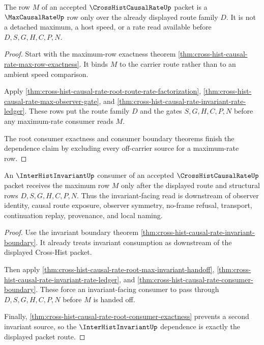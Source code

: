 \begin{theorem}
\label{thm:cross-hist-causal-rate-maxcausalrate-dependence}
The row $M$ of an accepted $\CrossHistCausalRateUp$ packet is a $\MaxCausalRateUp$ row only over the already displayed route family $D$. It is not a detached maximum, a host speed, or a rate read available before $D,S,G,H,C,P,N$.
\end{theorem}
\begin{proof}
Start with the maximum-row exactness theorem \autoref{thm:cross-hist-causal-rate-max-row-exactness}. It binds $M$ to the carrier route rather than to an ambient speed comparison.

Apply \autoref{thm:cross-hist-causal-rate-root-route-rate-factorization}, \autoref{thm:cross-hist-causal-rate-max-observer-gate}, and \autoref{thm:cross-hist-causal-rate-invariant-rate-ledger}. These rows put the route family $D$ and the gates $S,G,H,C,P,N$ before any maximum-rate consumer reads $M$.

The root consumer exactness and consumer boundary theorems finish the dependence claim by excluding every off-carrier source for a maximum-rate row.
\end{proof}

\begin{theorem}
\label{thm:cross-hist-causal-rate-interhist-invariant-dependence}
An $\InterHistInvariantUp$ consumer of an accepted $\CrossHistCausalRateUp$ packet receives the maximum row $M$ only after the displayed route and structural rows $D,S,G,H,C,P,N$. Thus the invariant-facing read is downstream of observer identity, causal route exposure, observer symmetry, no-frame refusal, transport, continuation replay, provenance, and local naming.
\end{theorem}
\begin{proof}
Use the invariant boundary theorem \autoref{thm:cross-hist-causal-rate-invariant-boundary}. It already treats invariant consumption as downstream of the displayed Cross-Hist packet.

Then apply \autoref{thm:cross-hist-causal-rate-root-max-invariant-handoff}, \autoref{thm:cross-hist-causal-rate-invariant-rate-ledger}, and \autoref{thm:cross-hist-causal-rate-consumer-boundary}. These force an invariant-facing consumer to pass through $D,S,G,H,C,P,N$ before $M$ is handed off.

Finally, \autoref{thm:cross-hist-causal-rate-root-consumer-exactness} prevents a second invariant source, so the $\InterHistInvariantUp$ dependence is exactly the displayed packet route.
\end{proof}

